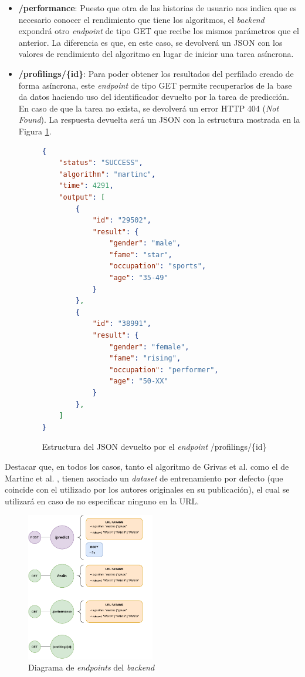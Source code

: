 \begin{itemize}
	\item \textbf{/performance}: Puesto que otra de las historias de usuario nos indica que es necesario conocer el rendimiento que tiene los algoritmos,
	      el \textit{backend} expondrá otro \textit{endpoint} de tipo GET que recibe los mismos parámetros que el anterior. La diferencia es que, en este caso,
	      se devolverá un JSON con los valores de rendimiento del algoritmo en lugar de iniciar una tarea asíncrona.

	\item \textbf{/profilings/\{id\}}: Para poder obtener los resultados del perfilado creado de forma asíncrona, este \textit{endpoint} de tipo GET
	      permite recuperarlos de la base da datos haciendo uso del identificador devuelto por la tarea de predicción. En caso de que la tarea
	      no exista, se devolverá un error HTTP 404 (\textit{Not Found}). La respuesta devuelta será un JSON con la estructura mostrada en la Figura \ref{fig:profiling_json}.

	      \begin{figure}[H]
		      \begin{lstlisting}[language=json]
{
	"status": "SUCCESS",
	"algorithm": "martinc",
	"time": 4291,
	"output": [
		{
			"id": "29502",
			"result": {
				"gender": "male",
				"fame": "star",
				"occupation": "sports",
				"age": "35-49"
			}
		},
		{
			"id": "38991",
			"result": {
				"gender": "female",
				"fame": "rising",
				"occupation": "performer",
				"age": "50-XX"
			}
		},
	]
}\end{lstlisting}
		      \caption{Estructura del JSON devuelto por el \textit{endpoint} /profilings/\{id\}}
		      \label{fig:profiling_json}
	      \end{figure}
\end{itemize}

Destacar que, en todos los casos, tanto el algoritmo de Grivas et al. \cite{grivas2015author} como el de Martinc et al. \cite{martinc2019hot}, tienen asociado un \textit{dataset} de entrenamiento por defecto (que coincide
con el utilizado por los autores originales en su publicación), el cual se utilizará en caso de no especificar ninguno en la URL.

\begin{figure}[H]
	\centering
	\includegraphics[width=0.5\textwidth]{diagramas/endpoints.pdf}
	\caption{Diagrama de \textit{endpoints} del \textit{backend}}
	\label{fig:endpoints}
\end{figure}

